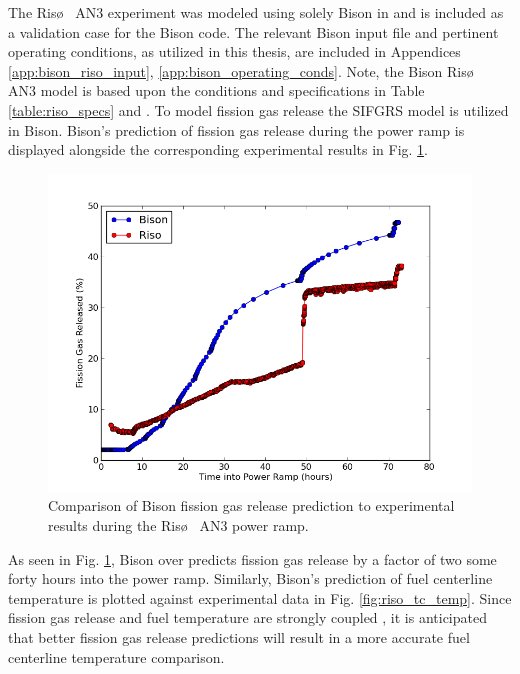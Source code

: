 The Ris\o~ AN3 experiment was modeled using solely Bison in \cite{Perez} and is included as a validation case for the Bison code. The relevant Bison input file and pertinent operating conditions, as utilized in this thesis, are included in Appendices \ref{app:bison_riso_input}, \ref{app:bison_operating_conds}. Note, the Bison Ris\o~ AN3 model is based upon the conditions and specifications in Table \ref{table:riso_specs} and \cite{Perez2}. To model fission gas release the \ac{SIFGRS} model is utilized in Bison. Bison's prediction of fission gas release during the power ramp is displayed alongside the corresponding experimental results in Fig. \ref{fig:riso_fgr}.  
\begin{figure}
\caption{\label{fig:riso_fgr}
Comparison of Bison fission gas release prediction to experimental results during the Ris\o~ AN3 power ramp.}
 \begin{center}
  \includegraphics[scale=.75]{./Chapter4/fgr_comparison.png}
 \end{center}
\end{figure} 
As seen in Fig. \ref{fig:riso_fgr}, Bison over predicts fission gas release by a factor of two some forty hours into the power ramp. Similarly, Bison's prediction of fuel centerline temperature is plotted against experimental data in Fig. \ref{fig:riso_tc_temp}. Since fission gas release and fuel temperature are strongly coupled \cite{Perez}, it is anticipated that better fission gas release predictions will result in a more accurate fuel centerline temperature comparison. 

